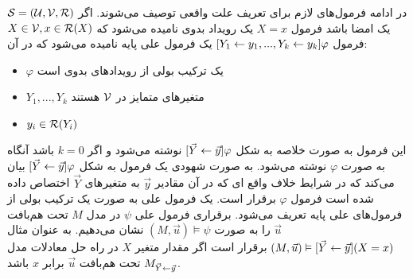 در ادامه‌ فرمول‌های لازم برای تعریف علت واقعی توصیف می‌شوند.
اگر
$\mathcal{S} = (\mathcal{U},\mathcal{V},\mathcal{R})$
یک امضا باشد فرمول
‍‍$X=x$
یک رویداد بدوی نامیده می‌شود که
‍$X \in \mathcal{V},x \in \mathcal{R}(X)$
فرمول
$[Y_1 \leftarrow y_1,...,Y_k\leftarrow y_k]\varphi$
یک فرمول علی پایه نامیده می‌شود که در آن:
\begin{itemize}
    \item $\varphi$
          یک ترکیب بولی از رویداد‌های بدوی است
    \item $Y_1,...,Y_k$
          متغیر‌های متمایز در
          $\mathcal{V}$
          هستند
    \item $y_i \in \mathcal{R}(Y_i)$
\end{itemize}
این فرمول به صورت خلاصه به شکل
$[\vec{Y}\leftarrow \vec{y}]\varphi$
نوشته می‌شود و اگر
$k=0$
باشد آنگاه به صورت
$\varphi$
نوشته می‌شود.
به صورت شهودی یک فرمول به شکل
$[\vec{Y}\leftarrow \vec{y}]\varphi$
بیان می‌کند که در شرایط خلاف واقع‌ ای که در آن مقادیر
$\vec{y}$
به متغیر‌های
$\vec{Y}$
اختصاص داده شده است فرمول
$\varphi$
برقرار است.
یک فرمول علی به صورت یک ترکیب بولی از فرمول‌های علی پایه تعریف می‌شود.
برقراری فرمول علی
$\psi$
در مدل
$M$
تحت هم‌بافت
$\vec u$
را به صورت
$(M,\vec u) \vDash \psi$
نشان می‌دهیم.
به عنوان مثال
$(M,\vec{u}) \vDash [\vec{Y}\leftarrow \vec{y}](X=x)$
برقرار است اگر مقدار متغیر
$X$
در راه حل معادلات مدل
$M_{\vec{Y}\leftarrow \vec{y}}$
تحت هم‌بافت
$\vec u$
برابر
$x$
باشد.

